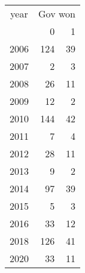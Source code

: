 \footnotesize\begin{tabular}[t]{lrr}
\toprule
\multicolumn{1}{c}{year} & \multicolumn{2}{c}{Gov won} \\
\cmidrule(l{3pt}r{3pt}){1-1} \cmidrule(l{3pt}r{3pt}){2-3}
  & 0 & 1\\
\midrule
2006 & 124 & 39\\
2007 & 2 & 3\\
2008 & 26 & 11\\
2009 & 12 & 2\\
2010 & 144 & 42\\
2011 & 7 & 4\\
2012 & 28 & 11\\
2013 & 9 & 2\\
2014 & 97 & 39\\
2015 & 5 & 3\\
2016 & 33 & 12\\
2018 & 126 & 41\\
2020 & 33 & 11\\
\bottomrule
\end{tabular}

